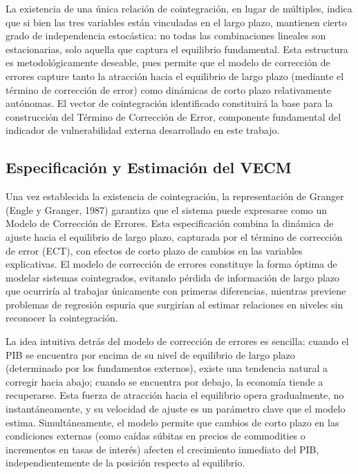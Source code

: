 \documentclass[3p,11pt,draft,natbib=false]{elsarticle}
\begin{document}
La existencia de una única relación de cointegración, en lugar de múltiples, indica que si bien las tres variables están vinculadas en el largo plazo, mantienen cierto grado de independencia estocástica: no todas las combinaciones lineales son estacionarias, solo aquella que captura el equilibrio fundamental. Esta estructura es metodológicamente deseable, pues permite que el modelo de corrección de errores capture tanto la atracción hacia el equilibrio de largo plazo (mediante el término de corrección de error) como dinámicas de corto plazo relativamente autónomas. El vector de cointegración identificado constituirá la base para la construcción del Término de Corrección de Error, componente fundamental del indicador de vulnerabilidad externa desarrollado en este trabajo.

\subsection{Especificación y Estimación del VECM}
\label{sec:vecm}

Una vez establecida la existencia de cointegración, la representación de Granger (Engle y Granger, 1987) garantiza que el sistema puede expresarse como un Modelo de Corrección de Errores. Esta especificación combina la dinámica de ajuste hacia el equilibrio de largo plazo, capturada por el término de corrección de error (ECT), con efectos de corto plazo de cambios en las variables explicativas. El modelo de corrección de errores constituye la forma óptima de modelar sistemas cointegrados, evitando pérdida de información de largo plazo que ocurriría al trabajar únicamente con primeras diferencias, mientras previene problemas de regresión espuria que surgirían al estimar relaciones en niveles sin reconocer la cointegración.

La idea intuitiva detrás del modelo de corrección de errores es sencilla: cuando el PIB se encuentra por encima de su nivel de equilibrio de largo plazo (determinado por los fundamentos externos), existe una tendencia natural a corregir hacia abajo; cuando se encuentra por debajo, la economía tiende a recuperarse. Esta fuerza de atracción hacia el equilibrio opera gradualmente, no instantáneamente, y su velocidad de ajuste es un parámetro clave que el modelo estima. Simultáneamente, el modelo permite que cambios de corto plazo en las condiciones externas (como caídas súbitas en precios de commodities o incrementos en tasas de interés) afecten el crecimiento inmediato del PIB, independientemente de la posición respecto al equilibrio.
\end{document}
